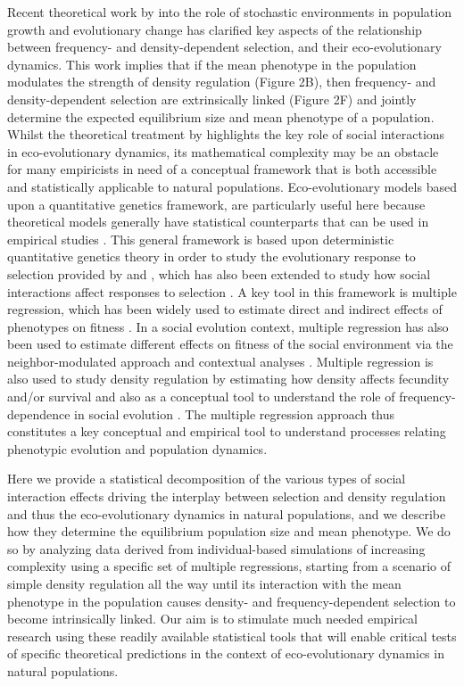 \documentclass{article}
\begin{document}
 Recent theoretical work by \citet{Engen2020} into the role of stochastic environments in population growth and evolutionary change has clarified key aspects of the relationship between frequency- and density-dependent selection, and their eco-evolutionary dynamics. This work implies that if the mean phenotype in the population modulates the strength of density regulation (Figure 2B), then frequency- and density-dependent selection are extrinsically linked (Figure 2F) and jointly determine the expected equilibrium size and mean phenotype of a population. Whilst the theoretical treatment by \citet{Engen2020} highlights the key role of social interactions in eco-evolutionary dynamics, its mathematical complexity may be an obstacle for many empiricists in need of a conceptual framework that is both accessible and statistically applicable to natural populations. Eco-evolutionary models based upon a quantitative genetics framework, are particularly useful here because theoretical models generally have statistical counterparts that can be used in empirical studies  \citep{Lande1983, Robertson1966}. This general framework is based upon deterministic quantitative genetics theory in order to study the evolutionary response to selection provided by \cite{Lande1976, Lande1979} and \cite{Lande1983}, which has also been extended to study how social interactions affect responses to selection \citep{Queller1985a, Wolf1999SocialSelection, McGlothlin2010, Araya-Ajoy2020}. A key tool in this framework is multiple regression, which has been widely used to estimate direct and indirect effects of phenotypes on fitness \citep{Kingsolver2011}. In a social evolution context, multiple regression has also been used to estimate different effects on fitness of the social environment via the neighbor-modulated approach and contextual analyses \citep{Heisler1987, Okasha2006}. Multiple regression is also used to study density regulation by estimating how density affects fecundity and/or survival \citep{Araya-Ajoy2021, Saether2021} and also as a conceptual tool to understand the role of frequency-dependence in social evolution \citep{Araya-Ajoy2020, Westneat2012a}. The multiple regression approach thus constitutes a key conceptual and empirical tool to understand processes relating phenotypic evolution and population dynamics. 

Here we provide a statistical decomposition of the various types of social interaction effects driving the interplay between selection and density regulation and thus the eco-evolutionary dynamics in natural populations, and we describe how they determine the equilibrium population size and mean phenotype. We do so by analyzing data derived from individual-based simulations of increasing complexity using a specific set of multiple regressions, starting from a scenario of simple density regulation all the way until its interaction with the mean phenotype in the population causes density- and frequency-dependent selection to become intrinsically linked. Our aim is to stimulate much needed empirical research using these readily available statistical tools that will enable critical tests of specific theoretical predictions in the context of eco-evolutionary dynamics in natural populations.
\end{document}
